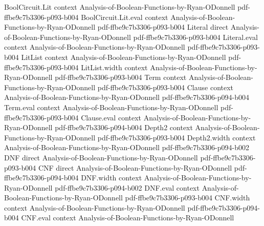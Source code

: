 \begin{theorem}
\label{DecisionTree.fourierCoeff_signEval}
\leanok
{}
\proofstep
  {BoolCircuit.Lit}
  {context}
  {Analysis-of-Boolean-Functions-by-Ryan-ODonnell}
  {pdf-ffbe9c7b3306-p093-b004}
\proofstep
  {BoolCircuit.Lit.eval}
  {context}
  {Analysis-of-Boolean-Functions-by-Ryan-ODonnell}
  {pdf-ffbe9c7b3306-p093-b004}
\proofstep
  {Literal}
  {direct}
  {Analysis-of-Boolean-Functions-by-Ryan-ODonnell}
  {pdf-ffbe9c7b3306-p093-b004}
\proofstep
  {Literal.eval}
  {context}
  {Analysis-of-Boolean-Functions-by-Ryan-ODonnell}
  {pdf-ffbe9c7b3306-p093-b004}
\proofstep
  {LitList}
  {context}
  {Analysis-of-Boolean-Functions-by-Ryan-ODonnell}
  {pdf-ffbe9c7b3306-p093-b004}
\proofstep
  {LitList.width}
  {context}
  {Analysis-of-Boolean-Functions-by-Ryan-ODonnell}
  {pdf-ffbe9c7b3306-p093-b004}
\proofstep
  {Term}
  {context}
  {Analysis-of-Boolean-Functions-by-Ryan-ODonnell}
  {pdf-ffbe9c7b3306-p093-b004}
\proofstep
  {Clause}
  {context}
  {Analysis-of-Boolean-Functions-by-Ryan-ODonnell}
  {pdf-ffbe9c7b3306-p094-b004}
\proofstep
  {Term.eval}
  {context}
  {Analysis-of-Boolean-Functions-by-Ryan-ODonnell}
  {pdf-ffbe9c7b3306-p093-b004}
\proofstep
  {Clause.eval}
  {context}
  {Analysis-of-Boolean-Functions-by-Ryan-ODonnell}
  {pdf-ffbe9c7b3306-p094-b004}
\proofstep
  {Depth2}
  {context}
  {Analysis-of-Boolean-Functions-by-Ryan-ODonnell}
  {pdf-ffbe9c7b3306-p093-b004}
\proofstep
  {Depth2.width}
  {context}
  {Analysis-of-Boolean-Functions-by-Ryan-ODonnell}
  {pdf-ffbe9c7b3306-p094-b002}
\proofstep
  {DNF}
  {direct}
  {Analysis-of-Boolean-Functions-by-Ryan-ODonnell}
  {pdf-ffbe9c7b3306-p093-b004}
\proofstep
  {CNF}
  {direct}
  {Analysis-of-Boolean-Functions-by-Ryan-ODonnell}
  {pdf-ffbe9c7b3306-p094-b004}
\proofstep
  {DNF.width}
  {context}
  {Analysis-of-Boolean-Functions-by-Ryan-ODonnell}
  {pdf-ffbe9c7b3306-p094-b002}
\proofstep
  {DNF.eval}
  {context}
  {Analysis-of-Boolean-Functions-by-Ryan-ODonnell}
  {pdf-ffbe9c7b3306-p093-b004}
\proofstep
  {CNF.width}
  {context}
  {Analysis-of-Boolean-Functions-by-Ryan-ODonnell}
  {pdf-ffbe9c7b3306-p094-b004}
\proofstep
  {CNF.eval}
  {context}
  {Analysis-of-Boolean-Functions-by-Ryan-ODonnell}

\end{theorem}
